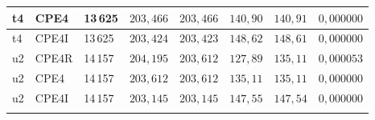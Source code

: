 \begin{table}[htbp]
\begin{tabular}{llllllll}
        \hline
        t4 & CPE4 & 13\,625 & $203{,}466$ & $203{,}466$ & $140{,}90$ & $140{,}91$ & $0{,}000000$ \\
        \hline
        t4 & CPE4I & 13\,625 & $203{,}424$ & $203{,}423$ & $148{,}62$ & $148{,}61$ & $0{,}000000$ \\
        \hline
        u2 & CPE4R & 14\,157 & $204{,}195$ & $203{,}612$ & $127{,}89$ & $135{,}11$ & $0{,}000053$ \\
        \hline
        u2 & CPE4 & 14\,157 & $203{,}612$ & $203{,}612$ & $135{,}11$ & $135{,}11$ & $0{,}000000$ \\
        \hline
        u2 & CPE4I & 14\,157 & $203{,}145$ & $203{,}145$ & $147{,}55$ & $147{,}54$ & $0{,}000000$ \\
        \hline
        \arrayrulecolor{black}
    \end{tabular}
\end{table}
